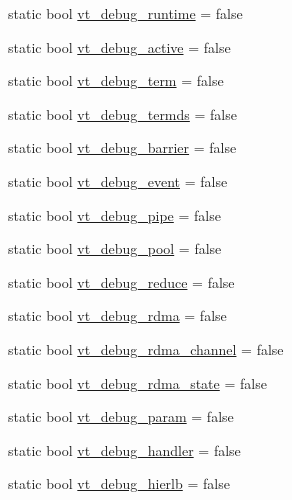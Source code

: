 \begin{DoxyCompactItemize}
\item 
static bool \hyperlink{structvt_1_1arguments_1_1_arg_config_ae09f0220544451872310ed5188b98d9b}{vt\+\_\+debug\+\_\+runtime} = false
\item 
static bool \hyperlink{structvt_1_1arguments_1_1_arg_config_aa40cb6ebcb449382ec1da2d73855de1f}{vt\+\_\+debug\+\_\+active} = false
\item 
static bool \hyperlink{structvt_1_1arguments_1_1_arg_config_aff950c7950ea868ccc78769a9a9ccf45}{vt\+\_\+debug\+\_\+term} = false
\item 
static bool \hyperlink{structvt_1_1arguments_1_1_arg_config_abcc1685602fa86f685601ad4f65c422e}{vt\+\_\+debug\+\_\+termds} = false
\item 
static bool \hyperlink{structvt_1_1arguments_1_1_arg_config_aa521e854796aada164cd0316c48d8e23}{vt\+\_\+debug\+\_\+barrier} = false
\item 
static bool \hyperlink{structvt_1_1arguments_1_1_arg_config_a23460617fec839e7ae8d48427172b6c5}{vt\+\_\+debug\+\_\+event} = false
\item 
static bool \hyperlink{structvt_1_1arguments_1_1_arg_config_aba00af8a95c7fd6d41d08407a5fb33f1}{vt\+\_\+debug\+\_\+pipe} = false
\item 
static bool \hyperlink{structvt_1_1arguments_1_1_arg_config_a5fce7eff37704977022f2591d19471f8}{vt\+\_\+debug\+\_\+pool} = false
\item 
static bool \hyperlink{structvt_1_1arguments_1_1_arg_config_a6001b8760c0e1d53b0e55fc8c9de784e}{vt\+\_\+debug\+\_\+reduce} = false
\item 
static bool \hyperlink{structvt_1_1arguments_1_1_arg_config_a38e43be609c02e54398d44ceca1095fe}{vt\+\_\+debug\+\_\+rdma} = false
\item 
static bool \hyperlink{structvt_1_1arguments_1_1_arg_config_a78388ec62b79383eacf3e48b67a47a21}{vt\+\_\+debug\+\_\+rdma\+\_\+channel} = false
\item 
static bool \hyperlink{structvt_1_1arguments_1_1_arg_config_ade199a9171a20b108af3b3631f82e5d5}{vt\+\_\+debug\+\_\+rdma\+\_\+state} = false
\item 
static bool \hyperlink{structvt_1_1arguments_1_1_arg_config_a7a9c93ea8a341a22ff4d1e58c3543d17}{vt\+\_\+debug\+\_\+param} = false
\item 
static bool \hyperlink{structvt_1_1arguments_1_1_arg_config_aa2652f92547befd3f21fa9e7bf40bf94}{vt\+\_\+debug\+\_\+handler} = false
\item 
static bool \hyperlink{structvt_1_1arguments_1_1_arg_config_a427c7fec8f7075a40014f1e6e65f849b}{vt\+\_\+debug\+\_\+hierlb} = false

\end{DoxyCompactItemize}
